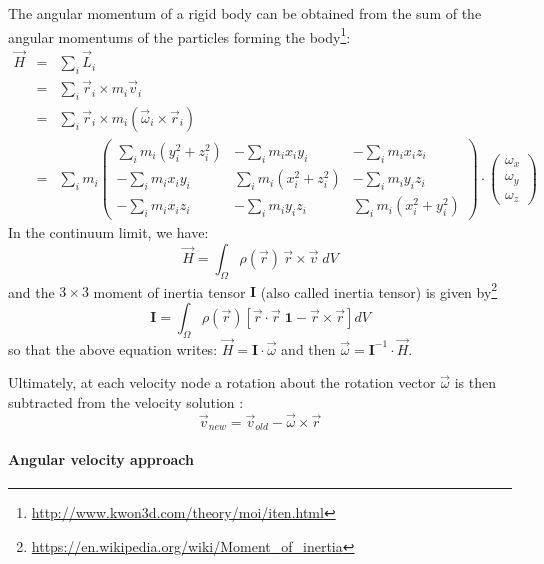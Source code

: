 The angular momentum of a rigid body can be obtained from the sum 
of the angular momentums of the particles forming the 
body\footnote{\url{http://www.kwon3d.com/theory/moi/iten.html}}:
\begin{eqnarray}
\vec H 
&=& \sum_i \vec L_i\\
&=& \sum_i \vec r_i \times m_i \vec v_i\\
&=& \sum_i \vec r_i \times m_i (\vec \omega_i \times \vec r_i)\\
&=& \sum_i m_i 
\left(
\begin{array}{ccc}
\sum_i m_i(y_i^2+z_i^2) & -\sum_i m_i x_iy_i & -\sum_i m_i x_i z_i \\
-\sum_i m_i x_iy_i & \sum_i m_i(x_i^2+z_i^2) & -\sum_i m_i y_i z_i \\
-\sum_i m_i x_i z_i & -\sum_i m_i y_i z_i & \sum_i m_i(x_i^2+y_i^2)
\end{array}
\right)
\cdot
\left(
\begin{array}{c}
\omega_x \\ \omega_y \\ \omega_z
\end{array}
\right)
\end{eqnarray}
In the continuum limit, we have:
\begin{equation}
{\vec H} = \int_\Omega \rho(\vec r) \, {\vec r} \times {\vec v}\; dV
\end{equation}
and the $3\times3$ moment of inertia tensor $\bm I$
(also called inertia tensor) is given by\footnote{\url{https://en.wikipedia.org/wiki/Moment\_of\_inertia}}
\begin{equation}
{\bm I}= 
\int_\Omega \rho(\vec r) [\vec r\cdot\vec r \; \bm 1 - \vec r \times \vec r  ] dV
\end{equation}
so that the above equation writes:
$
{\vec H}={\bm I}\cdot {\vec \omega}
$
and then ${\vec \omega}={\bm I}^{-1} \cdot {\vec H}$.

Ultimately, at each velocity node a rotation about the rotation 
vector ${\vec \omega}$ is then subtracted from the velocity 
solution \cite[eq. 26]{zhmt08}:
\begin{equation}
\vec v_{new} = \vec v_{old} - \vec \omega \times \vec r 
\end{equation}


\paragraph{Angular velocity approach}

